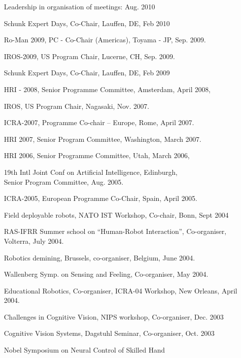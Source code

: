\documentclass{article}
\begin{document}
\begin{cv}
\begin{cvlist}{Leadership in organisation of meetings:}
  Aug. 2010
\item Schunk Expert Days, Co-Chair, Lauffen, DE,
  \cftdotfill{\cftdotsep} Feb 2010
\item Ro-Man 2009, PC - Co-Chair (Americas), Toyama - JP,
  \cftdotfill{\cftdotsep} Sep.  2009.
\item IROS-2009, US Program Chair, Lucerne, CH,
  \cftdotfill{\cftdotsep} Sep. 2009.
\item Schunk Expert Days, Co-Chair, Lauffen, DE,
  \cftdotfill{\cftdotsep} Feb 2009
\item HRI - 2008, Senior Programme Committee, Amsterdam,
  \cftdotfill{\cftdotsep} April 2008,
\item IROS, US Program Chair, Nagasaki, \cftdotfill{\cftdotsep}
  Nov. 2007.
\item ICRA-2007, Programme Co-chair -- Europe, Rome,
  \cftdotfill{\cftdotsep} April 2007.
\item HRI 2007, Senior Program Committee, Washington,
  \cftdotfill{\cftdotsep} March 2007.
\item HRI 2006, Senior Programme Committee, Utah,
  \cftdotfill{\cftdotsep} March 2006,
\item 19th Intl Joint Conf on Artificial Intelligence,
  Edinburgh,\\ Senior Program Committee, \cftdotfill{\cftdotsep}
  Aug. 2005.
\item ICRA-2005, European Programme Co-Chair, Spain,
  \cftdotfill{\cftdotsep} April 2005.
\item Field deployable robots, NATO IST Workshop, Co-chair, Bonn,
  \cftdotfill{\cftdotsep} Sept 2004
\item RAS-IFRR Summer school on ``Human-Robot Interaction'',
  Co-organiser, \\Volterra, \cftdotfill{\cftdotsep} July 2004.
\item Robotics demining, Brussels, co-organiser, Belgium,
  \cftdotfill{\cftdotsep} June 2004.
\item Wallenberg Symp. on Sensing and Feeling, Co-organiser,
  \cftdotfill{\cftdotsep} May 2004.
\item Educational Robotics, Co-organiser, ICRA-04 Workshop, New
  Orleans, \cftdotfill{\cftdotsep} April 2004.
\item Challenges in Cognitive Vision, NIPS workshop, Co-organiser,
  \cftdotfill{\cftdotsep} Dec. 2003
\item Cognitive Vision Systems, Dagstuhl Seminar, Co-organiser,
  \cftdotfill{\cftdotsep} Oct. 2003
\item Nobel Symposium on Neural Control of Skilled Hand

\end{cvlist}
\end{cv}
\end{document}
